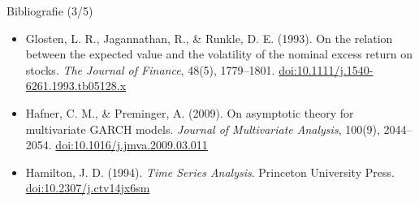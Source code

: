 \begin{frame}{Bibliografie (3/5)}
\begin{itemize}
    \item Glosten, L. R., Jagannathan, R., \& Runkle, D. E. (1993). On the relation between the expected value and the volatility of the nominal excess return on stocks. \textit{The Journal of Finance}, 48(5), 1779--1801. \href{https://doi.org/10.1111/j.1540-6261.1993.tb05128.x}{doi:10.1111/j.1540-6261.1993.tb05128.x}
    \item Hafner, C. M., \& Preminger, A. (2009). On asymptotic theory for multivariate GARCH models. \textit{Journal of Multivariate Analysis}, 100(9), 2044--2054. \href{https://doi.org/10.1016/j.jmva.2009.03.011}{doi:10.1016/j.jmva.2009.03.011}
    \item Hamilton, J. D. (1994). \textit{Time Series Analysis}. Princeton University Press. \href{https://doi.org/10.2307/j.ctv14jx6sm}{doi:10.2307/j.ctv14jx6sm}
\end{itemize}
\end{frame}

